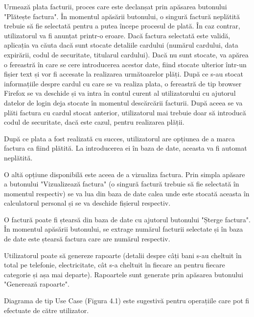 \documentclass[12pt]{book}
\begin{document}
Urmează plata facturii, proces care este declanșat prin apăsarea butonului "Plătește factura". În momentul apăsării butonului, o singură factură neplătită trebuie să fie selectată pentru a putea începe procesul de plată. În caz contrar, utilizatorul va fi anunțat printr-o eroare. Dacă factura selectată este validă, aplicația va căuta dacă sunt stocate detaliile cardului (numărul cardului, data expirării, codul de securitate, titularul cardului). Dacă nu sunt stocate, va apărea o fereastră în care se cere introducerea acestor date, fiind stocate ulterior într-un fișier text și vor fi accesate la realizarea următoarelor plăți. După ce s-au stocat informațiile despre cardul cu care se va realiza plata, o fereastră de tip browser Firefox se va deschide și va intra în contul curent al utilizatorului cu ajutorul datelor de login deja stocate în momentul descărcării facturii. După aceea se va plăti factura cu cardul stocat anterior, utilizatorul mai trebuie doar să introducă codul de securitate, dacă este cazul, pentru realizarea plății.

După ce plata a fost realizată cu succes, utilizatorul are opțiunea de a marca factura ca fiind plătită. La introducerea ei în baza de date, aceasta va fi automat neplătită. 

O altă opțiune disponibilă este aceea de a vizualiza factura. Prin simpla apăsare a butonului "Vizualizează factura" (o singură factură trebuie să fie selectată în momentul respectiv) se va lua din baza de date calea unde este stocată aceasta în calculatorul personal și se va deschide fișierul respectiv.

O factură poate fi ștearsă din baza de date cu ajutorul butonului "Șterge factura". În momentul apăsării butonului, se extrage numărul facturii selectate și în baza de date este ștearsă factura care are numărul respectiv.

Utilizatorul poate să genereze rapoarte (detalii despre câți bani s-au cheltuit în total pe telefonie, electricitate, cât s-a cheltuit în fiecare an pentru fiecare categorie și așa mai departe). Rapoartele sunt generate prin apăsarea butonului "Generează rapoarte".

Diagrama de tip Use Case (Figura 4.1) este sugestivă pentru operațiile care pot fi efectuate de către utilizator.
\end{document}
